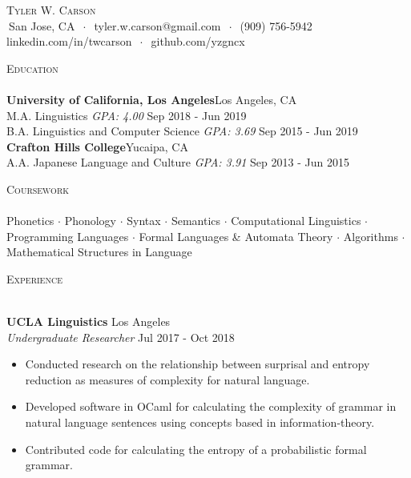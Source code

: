 \documentclass[]{article}
\newcommand{\lineunder} {
    \vspace*{-8pt} \\
    \hspace*{-18pt} \hrulefill \\
}
\newcommand{\header} [1] {
    {\hspace*{-18pt}\vspace*{6pt} \textsc{#1}}
    \vspace*{-6pt} \lineunder
}
\begin{document}
\vspace*{-40pt}

    

\vspace*{-10pt}
\begin{center}
	{\Huge \scshape {Tyler W. Carson}}\\
	$\ $San Jose, CA $\ \cdot\ $ tyler.w.carson@gmail.com $\ \cdot\ $ (909) 756-5942\\ linkedin.com/in/twcarson $\ \cdot\ $ github.com/yzgncx\\
\end{center}

\header{Education}
\textbf{University of California, Los Angeles}\hfill Los Angeles, CA\\
M.A. Linguistics \hspace*{36mm} \textit{GPA: 4.00} \hfill Sep 2018 - Jun 2019\\
\vspace{1mm}
B.A. Linguistics and Computer Science \hspace*{1mm} \textit{GPA: 3.69} \hfill Sep 2015 - Jun 2019\\
\vspace{1mm}
\textbf{Crafton Hills College}\hfill Yucaipa, CA\\
A.A. Japanese Language and Culture \hspace*{3.8mm} \textit{GPA: 3.91} \hfill Sep 2013 - Jun 2015\\
\vspace{1mm}

\header{Coursework}
Phonetics $\cdot$ Phonology $\cdot$ Syntax $\cdot$ Semantics $\cdot$ Computational Linguistics $\cdot$ Programming Languages $\cdot$ Formal Languages \& Automata Theory $\cdot$ Algorithms $\cdot$ Mathematical Structures in Language
\vspace*{2mm}


\header{Experience}
\vspace{1mm}

\textbf{UCLA Linguistics} \hfill Los Angeles\\
\textit{Undergraduate Researcher} \hfill Jul 2017 - Oct 2018\\
\vspace{-3mm}
\begin{itemize} \itemsep 0pt
	\item Conducted research on the relationship between surprisal and entropy reduction as measures of complexity for natural language.
	\item Developed software in OCaml for calculating the complexity of grammar in natural language sentences using concepts based in information-theory.
	\item Contributed code for calculating the entropy of a probabilistic formal grammar.
\end{itemize}
\end{document}
